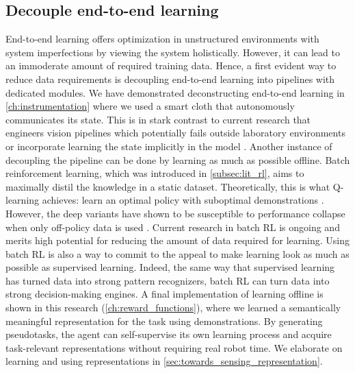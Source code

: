 \documentclass[\home/main.tex]{subfiles}
\begin{document}
\subsection{Decouple end-to-end learning}
End-to-end learning offers optimization in unstructured environments with system imperfections by viewing the system holistically. However, it can lead to an immoderate amount of required training data. Hence, a first evident way to reduce data requirements is decoupling end-to-end learning into pipelines with dedicated modules. 
We have demonstrated deconstructing end-to-end learning in \cref{ch:instrumentation} where we used a smart cloth that autonomously communicates its state. This is in stark contrast to current research that engineers vision pipelines \autocite{Wu2020} which potentially fails outside laboratory environments or incorporate learning the state implicitly in the model \autocite{Matas2018}. 
Another instance of decoupling the pipeline can be done by learning as much as possible offline. Batch reinforcement learning, which was introduced in \cref{subsec:lit_rl}, aims to maximally distil the knowledge in a static dataset. Theoretically, this is what Q-learning achieves: learn an optimal policy with suboptimal demonstrations \autocite{Sutton2018}. However, the deep variants have shown to be susceptible to performance collapse when only off-policy data is used \autocite{hausknecht2016policy}. Current research in batch RL is ongoing and merits high potential for reducing the amount of data required for learning. Using batch RL is also a way to commit to the appeal to make learning look as much as possible as supervised learning. Indeed, the same way that supervised learning has turned data into strong pattern recognizers, batch RL can turn data into strong decision-making engines. 
A final implementation of learning offline is shown in this research (\cref{ch:reward_functions}), where we learned a semantically meaningful representation for the task using demonstrations. By generating pseudotasks, the agent can self-supervise its own learning process and acquire task-relevant representations without requiring real robot time. We elaborate on learning and using representations in \cref{sec:towards_sensing_representation}. 
\end{document}
